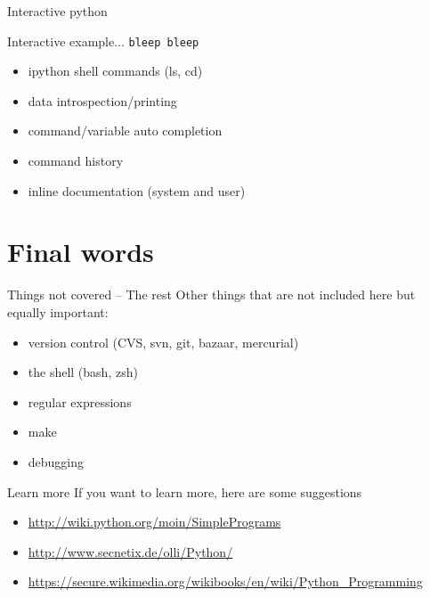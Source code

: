 \documentclass[xetex,10pt]{beamer}
\def\spacer{\vspace*{1em}}
\begin{document}
\begin{frame}[fragile]{Interactive python}

Interactive example... \pause \texttt{bleep bleep}

\spacer
\pause

\begin{itemize}
	\item ipython shell commands (ls, cd)
	\item data introspection/printing
	\item command/variable auto completion
	\item command history
	\item inline documentation (system and user)
\end{itemize}

\end{frame}

\section{Final words}

\begin{frame}[fragile]{Things not covered -- The rest}
	Other things that are not included here but equally important:
	\spacer
	\begin{itemize}
		\item version control (CVS, svn, git, bazaar, mercurial)
		\item the shell (bash, zsh)
		\item regular expressions
		\item make
		\item debugging
	\end{itemize}
\end{frame}

\begin{frame}[fragile]{Learn more}
	If you want to learn more, here are some suggestions
	\spacer
	\begin{itemize}
		\item \url{http://wiki.python.org/moin/SimplePrograms}
		\item \url{http://www.secnetix.de/olli/Python/}
		\item \url{https://secure.wikimedia.org/wikibooks/en/wiki/Python_Programming}
	\end{itemize}
\end{frame}
\end{document}

